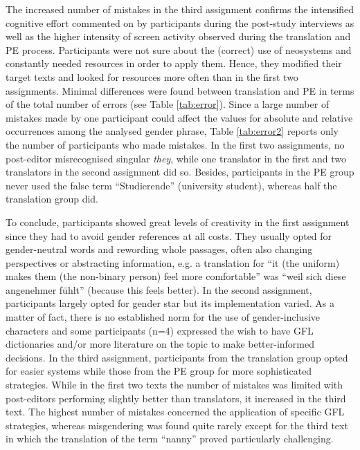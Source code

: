 The increased number of mistakes in the third assignment confirms the intensified cognitive effort commented on by participants during the post-study interviews as well as the higher intensity of screen activity observed during the translation and PE process. Participants were not sure about the (correct) use of neosystems and constantly needed resources in order to apply them. Hence, they modified their target texts and looked for resources more often than in the first two assignments. Minimal differences were found between translation and PE in terms of the total number of errors (see Table \ref{tab:error}). Since a large number of mistakes made by one participant could affect the values for absolute and relative occurrences among the analysed gender phrase, Table \ref{tab:error2} reports only the number of participants who made mistakes. In the first two assignments, no post-editor misrecognised singular \textit{they}, while one translator in the first and two translators in the second assignment did so. Besides, participants in the PE group never used the false term ``Studierende'' (university student), whereas half the translation group did. 

To conclude, participants showed great levels of creativity in the first assignment since they had to avoid gender references at all costs. They usually opted for gender-neutral words and rewording whole passages, often also changing perspectives or abstracting information, e.g. a translation for ``it (the uniform) makes them (the non-binary person) feel more comfortable'' was ``weil sich diese angenehmer  fühlt'' (because this feels better). In the second assignment, participants largely opted for gender star but its implementation varied. As a matter of fact, there is no established norm for the use of gender-inclusive characters and some participants (n=4) expressed the wish to have GFL dictionaries and/or more literature on the topic to make better-informed decisions. In the third assignment, participants from the translation group opted for easier systems while those from the PE group for more sophisticated strategies. While in the first two texts the number of mistakes was limited with post-editors performing slightly better than translators, it increased in the third text. The highest number of mistakes concerned the application of specific GFL strategies, whereas misgendering was found quite rarely except for the third text in which the translation of the term ``nanny'' proved particularly challenging.


